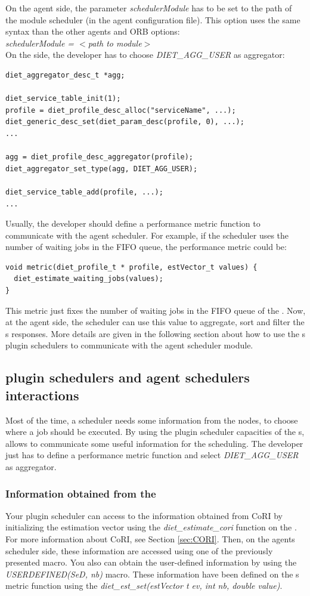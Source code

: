On the agent side, the parameter \textit{schedulerModule} has to be
set to the path of the module scheduler (in the agent configuration
file). This option uses the same syntax than the other agents and ORB
options:\\
\indent\textit{schedulerModule = $<$path to module$>$}\\
On the {\sed} side, the developer has to choose \textit{DIET\_AGG\_USER} as
aggregator:
\begin{verbatim}
diet_aggregator_desc_t *agg;

diet_service_table_init(1);
profile = diet_profile_desc_alloc("serviceName", ...);
diet_generic_desc_set(diet_param_desc(profile, 0), ...);
...
 
agg = diet_profile_desc_aggregator(profile); 
diet_aggregator_set_type(agg, DIET_AGG_USER);

diet_service_table_add(profile, ...);
...
\end{verbatim}
Usually, the developer should define a performance metric function to
communicate with the agent scheduler. For example, if the scheduler uses
the number of waiting jobs in the FIFO queue, the performance metric
could be:
\begin{verbatim}
void metric(diet_profile_t * profile, estVector_t values) {
  diet_estimate_waiting_jobs(values);
}
\end{verbatim}
This metric just fixes the number of waiting jobs in the FIFO queue of the
{\sed}. Now, at the agent side, the scheduler can use this value to aggregate,
sort and filter the {\sed}s responses. More details are given in the following
section about how to use the {\sed}s plugin schedulers to communicate with the
agent scheduler module.

\subsection{{\sed} plugin schedulers and agent schedulers interactions}
Most of the time, a scheduler needs some information from the nodes, to choose
where a job should be executed. By using the plugin scheduler capacities of
the {\sed}s, \diet allows to communicate some useful information for the 
scheduling. The developer just has to define a performance metric function
and select \textit{DIET\_AGG\_USER} as aggregator.

\subsubsection{Information obtained from the {\sed}}
Your plugin scheduler can access to the information obtained from CoRI
by initializing the estimation vector using the \textit{diet\_estimate\_cori}
function on the {\sed}. For more information about CoRI, see Section
\ref{sec:CORI}. Then, on the agents scheduler side, these information are
accessed using one of the previously presented macro.
You also can obtain the user-defined information by using the
\textit{USERDEFINED(SeD, nb)} macro. These information have been defined
on the {\sed}s metric function using the \textit{diet\_est\_set(estVector t ev,
int nb, double value)}.

